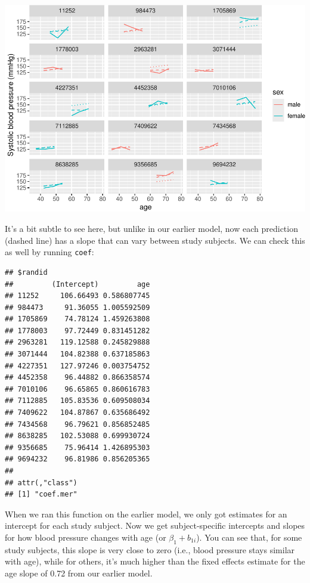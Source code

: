\documentclass[
]{book}
\newenvironment{Shaded}{\begin{snugshade}}{\end{snugshade}}
\newcommand{\KeywordTok}[1]{\textcolor[rgb]{0.13,0.29,0.53}{\textbf{#1}}}
\newcommand{\NormalTok}[1]{#1}
\newcommand{\OperatorTok}[1]{\textcolor[rgb]{0.81,0.36,0.00}{\textbf{#1}}}
\newcommand{\StringTok}[1]{\textcolor[rgb]{0.31,0.60,0.02}{#1}}
\begin{document}
\includegraphics{adv_epi_analysis_files/figure-latex/unnamed-chunk-305-1.pdf}

It's a bit subtle to see here, but unlike in our earlier model, now each
prediction (dashed line) has a slope that can vary between study subjects.
We can check this as well by running \texttt{coef}:

\begin{Shaded}
\end{Shaded}

\begin{verbatim}
## $randid
##         (Intercept)         age
## 11252     106.66493 0.586807745
## 984473     91.36055 1.005592509
## 1705869    74.78124 1.459263808
## 1778003    97.72449 0.831451282
## 2963281   119.12588 0.245829888
## 3071444   104.82388 0.637185863
## 4227351   127.97246 0.003754752
## 4452358    96.44882 0.866358574
## 7010106    96.65865 0.860616783
## 7112885   105.83536 0.609508034
## 7409622   104.87867 0.635686492
## 7434568    96.79621 0.856852485
## 8638285   102.53088 0.699930724
## 9356685    75.96414 1.426895303
## 9694232    96.81986 0.856205365
## 
## attr(,"class")
## [1] "coef.mer"
\end{verbatim}

When we ran this function on the earlier model, we only got estimates for an
intercept for each study subject. Now we get subject-specific intercepts and
slopes for how blood pressure changes with age (or \(\beta_{1} + b_{1i}\)). You
can see that, for some study subjects, this slope is very close to zero (i.e.,
blood pressure stays similar with age), while for others, it's much higher than
the fixed effects estimate for the age slope of 0.72 from our earlier model.
\end{document}
